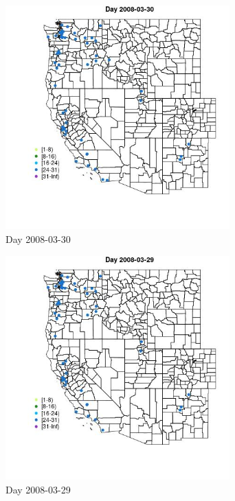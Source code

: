 \begin{figure} 
\centering  
\includegraphics[width=0.77\textwidth]{Code_Outputs/Report_ML_input_PM25_Step4_part_e_de_duplicated_aves_MapObsDay2008-03-30.jpg} 
\caption{\label{fig:Report_ML_input_PM25_Step4_part_e_de_duplicated_avesMapObsDay2008-03-30}Day 2008-03-30} 
\end{figure} 
 

\begin{figure} 
\centering  
\includegraphics[width=0.77\textwidth]{Code_Outputs/Report_ML_input_PM25_Step4_part_e_de_duplicated_aves_MapObsDay2008-03-29.jpg} 
\caption{\label{fig:Report_ML_input_PM25_Step4_part_e_de_duplicated_avesMapObsDay2008-03-29}Day 2008-03-29} 
\end{figure} 
 

